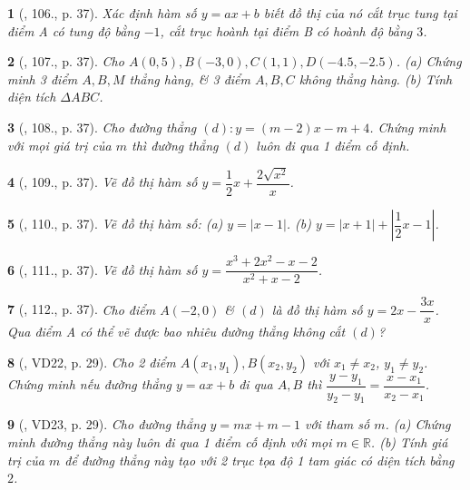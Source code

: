 \documentclass{article}
\newtheorem{baitoan}{}
\begin{document}
\begin{baitoan}[\cite{Tuyen_Toan_9_old}, 106., p. 37]
	Xác định hàm số $y = ax + b$ biết đồ thị của nó cắt trục tung tại điểm A có tung độ bằng $-1$, cắt trục hoành tại điểm B có hoành độ bằng $3$.
\end{baitoan}

\begin{baitoan}[\cite{Tuyen_Toan_9_old}, 107., p. 37]
	Cho $A(0,5),B(-3,0),C(1,1),D(-4.5,-2.5)$. (a) Chứng minh 3 điểm $A,B,M$ thẳng hàng, \& 3 điểm $A,B,C$ không thẳng hàng. (b) Tính diện tích $\Delta ABC$.
\end{baitoan}

\begin{baitoan}[\cite{Tuyen_Toan_9_old}, 108., p. 37]
	Cho đường thẳng $(d):y = (m - 2)x - m + 4$. Chứng minh với mọi giá trị của $m$ thì đường thẳng $(d)$ luôn đi qua 1 điểm cố định.
\end{baitoan}

\begin{baitoan}[\cite{Tuyen_Toan_9_old}, 109., p. 37]
	Vẽ đồ thị hàm số $y = \dfrac{1}{2}x + \dfrac{2\sqrt{x^2}}{x}$.
\end{baitoan}

\begin{baitoan}[\cite{Tuyen_Toan_9_old}, 110., p. 37]
	Vẽ đồ thị hàm số: (a) $y = |x - 1|$. (b) $y = |x + 1| + \left|\dfrac{1}{2}x - 1\right|$.
\end{baitoan}

\begin{baitoan}[\cite{Tuyen_Toan_9_old}, 111., p. 37]
	Vẽ đồ thị hàm số $y = \dfrac{x^3 + 2x^2 - x - 2}{x^2 + x - 2}$.
\end{baitoan}

\begin{baitoan}[\cite{Tuyen_Toan_9_old}, 112., p. 37]
	Cho điểm $A(-2,0)$ \& $(d)$ là đồ thị hàm số $y = 2x - \dfrac{3x}{x}$. Qua điểm A có thể vẽ được bao nhiêu đường thẳng không cắt $(d)$?
\end{baitoan}

\begin{baitoan}[\cite{Binh_Toan_9_tap_1}, VD22, p. 29]
	Cho 2 điểm $A(x_1,y_1),B(x_2,y_2)$ với $x_1\ne x_2$, $y_1\ne y_2$. Chứng minh nếu đường thẳng $y = ax + b$ đi qua $A,B$ thì $ \dfrac{y - y_1}{y_2 - y_1} = \dfrac{x - x_1}{x_2 - x_1}$.
\end{baitoan}

\begin{baitoan}[\cite{Binh_Toan_9_tap_1}, VD23, p. 29]
	Cho đường thẳng $y = mx + m - 1$ với tham số $m$. (a) Chứng minh đường thẳng này luôn đi qua 1 điểm cố định với mọi $m\in\mathbb{R}$. (b) Tính giá trị của $m$ để đường thẳng này tạo với 2 trục tọa độ 1 tam giác có diện tích bằng $2$.
\end{baitoan}
\end{document}
